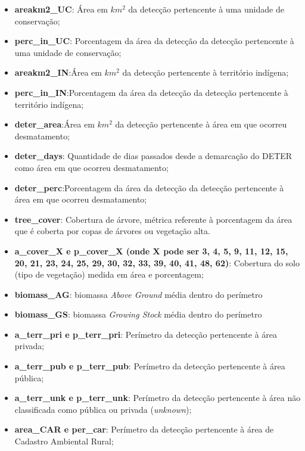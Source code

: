 \begin{multicols}{2}
    \begin{itemize}
\item \textbf{areakm2\_UC}: Área em $km^2$ da detecção pertencente à uma unidade de conservação;
\item \textbf{perc\_in\_UC}: Porcentagem da área da detecção da detecção pertencente à uma unidade de conservação;
\item \textbf{areakm2\_IN}:Área em $km^2$ da detecção pertencente à território indígena;
\item \textbf{perc\_in\_IN}:Porcentagem da área da detecção da detecção pertencente à território indígena;
\item \textbf{deter\_area}:Área em $km^2$ da detecção pertencente à área em que ocorreu desmatamento;
\item \textbf{deter\_days}: Quantidade de dias passados desde a demarcação do DETER como área em que ocorreu desmatamento; 
\item \textbf{deter\_perc}:Porcentagem da área da detecção da detecção pertencente à área em que ocorreu desmatamento;
\item \textbf{tree\_cover}: Cobertura de árvore, métrica referente à porcentagem da área que é coberta por copas de árvores ou vegetação alta.
\item \textbf{a\_cover\_X e p\_cover\_X (onde X pode ser 3, 4, 5, 9, 11, 12, 15, 20, 21, 23, 24, 25, 29, 30, 32, 33, 39, 40, 41, 48, 62)}: Cobertura do solo (tipo de vegetação) medida em área e porcentagem;
\item \textbf{biomass\_AG}: biomassa \textit{Above Ground} média dentro do perímetro
\item \textbf{biomass\_GS}: biomassa \textit{Growing Stock} média dentro do perímetro
\item \textbf{a\_terr\_pri e p\_terr\_pri}: Perímetro da detecção pertencente à área privada;
\item \textbf{a\_terr\_pub e p\_terr\_pub}: Perímetro da detecção pertencente à área pública;
\item \textbf{a\_terr\_unk e p\_terr\_unk}: Perímetro da detecção pertencente à área não classificada como pública ou privada (\textit{unknown});
\item \textbf{area\_CAR e per\_car}: Perímetro da detecção pertencente à área de Cadastro Ambiental Rural;
\end{itemize}
\end{multicols}




